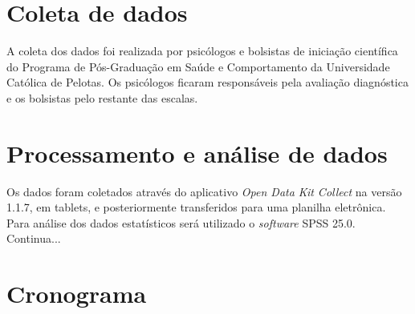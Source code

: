 \documentclass[chapter=TITLE,oneside,12pt,a4paper,english,brazil]{abntex2} %
\begin{document}
\section{Coleta de dados}\label{sec:coleta}

    A coleta dos dados foi realizada por psicólogos e bolsistas de iniciação
    científica do Programa de Pós-Graduação em Saúde e Comportamento da
    Universidade Católica de Pelotas.
    Os psicólogos ficaram responsáveis pela avaliação
    diagnóstica e os bolsistas pelo restante das escalas.

\section{Processamento e análise de dados}\label{sec:analise}

    Os dados foram coletados através do aplicativo \textit{Open Data Kit Collect}
    na versão 1.1.7, em tablets, e posteriormente transferidos para uma planilha
    eletrônica. Para análise dos dados estatísticos será utilizado o
    \textit{software} SPSS 25.0. Continua...

\section{Cronograma}\label{sec:cronograma}

\begin{table}[H]
\end{table}%
\end{document}
